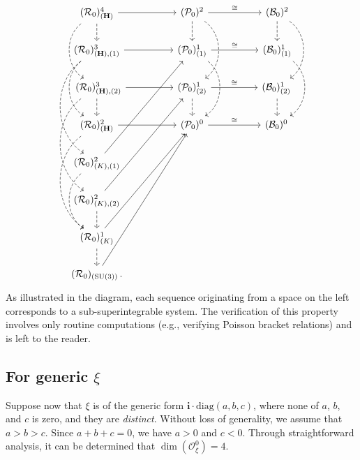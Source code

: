 \documentclass[12pt]{amsart}
\theoremstyle{definition}
\numberwithin{equation}{section}
\def\diag{\mathrm{diag}}
\newcommand{\imagunit}{\mathbf{i}}
\newcommand{\SU}{\mathrm{SU}}
\newcommand{\Oxi}{\mathcal{O}_{\xi}}
\newcommand{\Cartan}{\mathbf{H}}
\newcommand{\Rxizero}{\mathcal{R}_{0}}
\newcommand{\Pxizero}{\mathcal{P}_{0}}
\newcommand{\Bxizero}{\mathcal{B}_{0}}
\begin{document}
\begin{equation}
	\label{Diagram:SU3arrows000refined}
	\begin{tikzcd}
		(\Rxizero)^4_{(\Cartan)} \arrow[dd,bend right=55,dashed]\arrow[d,dashed] \arrow[rr] && (\Pxizero)^2    \arrow[dd,bend left=55,dashed]\arrow[d,dashed]  \arrow[rr,"\cong" ]   && (\Bxizero)^2  \arrow[d,dashed] \arrow[dd,bend left=55,dashed] \\
		(\Rxizero)^3_{(\Cartan),(1)}  
 \arrow[ddd,bend right=55,dashed] 
\arrow[dd,bend right=55,dashed]\arrow[rr ] && (\Pxizero)^1_{(1)}    \arrow[dd,bend left=55,dashed] \arrow[rr,"\cong" ]  && (\Bxizero)^1_{(1)}   \arrow[dd,bend left=55,dashed]\\  ~ (\Rxizero)^3_{(\Cartan),(2)} \arrow[ddd,bend right=55,dashed] \arrow[d, dashed]
\arrow[rr]		&& (\Pxizero)^1_{(2)}    \arrow[d,dashed] \arrow[rr,"\cong"] && (\Bxizero)^1_{(2)}  \,\arrow[d,dashed] \\
(\Rxizero)^2_{(\Cartan)} \arrow[ddd,bend right=55,dashed]   \arrow[rr]
		&& (\Pxizero)^0    \arrow[rr,"\cong"] && (\Bxizero)^0   \,\\
(\Rxizero)^2_{(K),(1)} \arrow[rruuu] \arrow[dd,bend right=55,dashed] &&  &&\\
(\Rxizero)^2_{(K),(2)} \arrow[rruuu] \arrow[d,dashed] &&  &&  \\
(\Rxizero)^1_{(K)} \arrow[rruuu] \arrow[d,dashed] &&  &&  \\
(\Rxizero)_{(\SU(3))}\,. \arrow[rruuuu] &&  &&  
	\end{tikzcd}
\end{equation} 
 As illustrated in the diagram, each sequence originating from a   space on the left corresponds to a sub-superintegrable system. The verification of this property involves only routine computations (e.g.,  verifying Poisson bracket relations) and is left to the reader.
  
 
 
\subsection{For generic   $\xi $}\label{subSec:xiabciallnonzero}

Suppose now that $\xi$ is of the generic form $\imagunit\cdot \diag(a  , b  , c  )$, where none of $a$, $b$, and $c$ is zero, and they are \textit{distinct}. Without loss of generality, we assume that $a>b>c$. Since $a+b+c=0$, we have $a>0$ and $c<0$. Through straightforward analysis, it can be determined that $\dim(\Oxi^0) = 4$.
\end{document}
